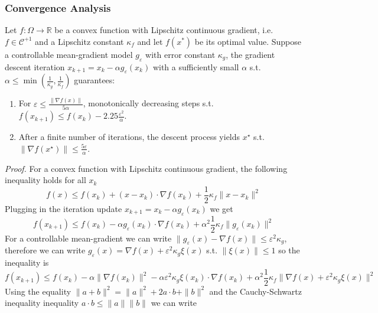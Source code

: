 \subsubsection{Convergence Analysis}
\label{convergence_proof}
\begin{theorem}
Let $f:\Omega\to\mathbb{R}$ be a convex function with Lipschitz continuous gradient, i.e. $f\in\mathcal{C}^{+1}$ and a Lipschitz constant $\kappa_f$ and let $f(x^{*})$ be its optimal value. Suppose a controllable mean-gradient model $g_{\varepsilon}$ with error constant $\kappa_g$, the gradient descent iteration $x_{k+1} = x_{k} - \alpha g_{\varepsilon}(x_k)$ with a sufficiently small $\alpha$ s.t. $\alpha \leq \min(\frac{1}{\kappa_g}, \frac{1}{\kappa_f})$ guarantees:
\begin{enumerate}
    \item For $\varepsilon \leq \frac{\|\nabla f(x)\|}{5\alpha}$, monotonically decreasing steps s.t. $f(x_{k+1}) \leq f(x_k) -  2.25 \frac{\varepsilon^2}{\alpha}$.
    \item After a finite number of iterations, the descent process yields $x^{\star}$ s.t. $\|\nabla f(x^{\star})\| \leq \frac{5\varepsilon}{\alpha}$.
\end{enumerate}
\end{theorem}
\textit{Proof.}
For a convex function with Lipschitz continuous gradient, the following inequality holds for all $x_k$
\begin{equation}
    f(x) \leq f(x_k) + (x - x_k) \cdot \nabla f(x_k) + \frac{1}{2}\kappa_f\|x - x_k\|^2
\end{equation}
Plugging in the iteration update $x_{k+1} = x_k - \alpha g_{\varepsilon}(x_k) $ we get
\begin{equation}
    f(x_{k+1}) \leq f(x_k) - \alpha g_{\varepsilon}(x_k) \cdot \nabla f(x_k) + \alpha^2 \frac{1}{2}\kappa_f\|g_{\varepsilon}(x_k)\|^2
\end{equation}
For a controllable mean-gradient we can write $\|g_{\varepsilon}(x) - \nabla f(x)\| \leq \varepsilon^2 \kappa_g $, therefore we can write $g_{\varepsilon}(x) = \nabla f(x) + \varepsilon^2 \kappa_g \xi(x)$ s.t. $\|\xi(x)\| \leq 1$ so the inequality is
\begin{equation}
    f(x_{k+1}) \leq f(x_k) - \alpha \|\nabla f(x_k)\|^2 - \alpha \varepsilon^2 \kappa_g \xi(x_k) \cdot \nabla f(x_k) + \alpha^2 \frac{1}{2}\kappa_f\|\nabla f(x) + \varepsilon^2 \kappa_g \xi(x)\|^2
\end{equation}
Using the equality $\|a+b\|^2 = \|a\|^2 + 2 a \cdot b + \|b\|^2$ and the Cauchy-Schwartz inequality inequality $a \cdot b\leq\|a\|\|b\|$ we can write
